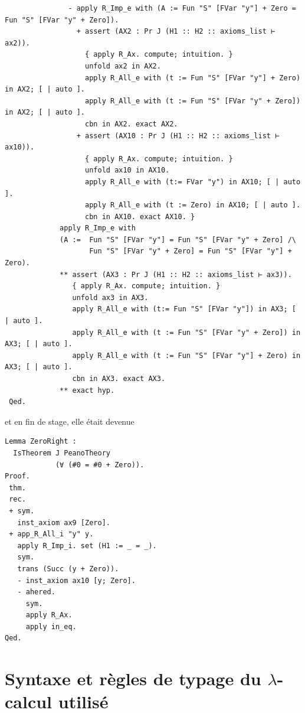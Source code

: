 \documentclass[a4paper]{article}
\begin{document}
\begin{verbatim}
               - apply R_Imp_e with (A := Fun "S" [FVar "y"] + Zero = Fun "S" [FVar "y" + Zero]).
                 + assert (AX2 : Pr J (H1 :: H2 :: axioms_list ⊢ ax2)).
                   { apply R_Ax. compute; intuition. }
                   unfold ax2 in AX2.
                   apply R_All_e with (t := Fun "S" [FVar "y"] + Zero) in AX2; [ | auto ].
                   apply R_All_e with (t := Fun "S" [FVar "y" + Zero]) in AX2; [ | auto ].
                   cbn in AX2. exact AX2.
                 + assert (AX10 : Pr J (H1 :: H2 :: axioms_list ⊢ ax10)).
                   { apply R_Ax. compute; intuition. }
                   unfold ax10 in AX10.
                   apply R_All_e with (t:= FVar "y") in AX10; [ | auto ].
                   apply R_All_e with (t := Zero) in AX10; [ | auto ].
                   cbn in AX10. exact AX10. }
             apply R_Imp_e with
             (A :=  Fun "S" [FVar "y"] = Fun "S" [FVar "y" + Zero] /\
                    Fun "S" [FVar "y" + Zero] = Fun "S" [FVar "y"] + Zero).
             ** assert (AX3 : Pr J (H1 :: H2 :: axioms_list ⊢ ax3)).
                { apply R_Ax. compute; intuition. }
                unfold ax3 in AX3.
                apply R_All_e with (t:= Fun "S" [FVar "y"]) in AX3; [ | auto ].
                apply R_All_e with (t := Fun "S" [FVar "y" + Zero]) in AX3; [ | auto ].
                apply R_All_e with (t := Fun "S" [FVar "y"] + Zero) in AX3; [ | auto ].
                cbn in AX3. exact AX3.
             ** exact hyp.
 Qed.    
\end{verbatim}
et en fin de stage, elle était devenue
\begin{verbatim}
Lemma ZeroRight :
  IsTheorem J PeanoTheory
            (∀ (#0 = #0 + Zero)).
Proof.
 thm.
 rec.
 + sym.
   inst_axiom ax9 [Zero].
 + app_R_All_i "y" y.
   apply R_Imp_i. set (H1 := _ = _).
   sym.
   trans (Succ (y + Zero)).
   - inst_axiom ax10 [y; Zero].
   - ahered.
     sym.
     apply R_Ax.
     apply in_eq.
Qed.
\end{verbatim}

\section{Syntaxe et règles de typage du $\lambda$-calcul utilisé} \label{lambda}
\end{document}
